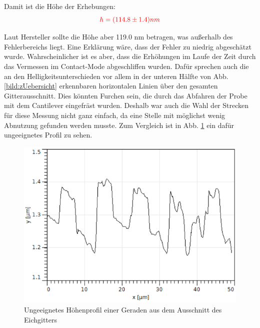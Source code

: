 Damit ist die Höhe der Erhebungen: 
\begin{equation*}
    \textcolor{red}{h = (114.8 \pm 1.4)nm}
\end{equation*}

Laut Hersteller sollte die Höhe aber 119.0 nm betragen, was außerhalb des Fehlerbereichs liegt. Eine Erklärung wäre, dass der Fehler 
zu niedrig abgeschätzt wurde. Wahrscheinlicher ist es aber, dass die Erhöhungen im Laufe der Zeit durch das Vermessen im Contact-Mode 
abgeschliffen wurden. Dafür sprechen auch die an den Helligkeitsunterschieden vor allem in der unteren Hälfte von 
Abb. \ref{bild:zUebersicht} erkennbaren horizontalen Linien über den gesamten Gitterausschnitt. Dies könnten Furchen sein, die durch das 
Abfahren der Probe mit dem Cantilever eingefräst wurden. Deshalb war auch die Wahl der Strecken für diese Messung nicht ganz einfach, da 
eine Stelle mit möglichst wenig Abnutzung gefunden werden musste. Zum Vergleich ist in Abb. \ref{bild:zUngeeignet} ein dafür 
ungeeignetes Profil zu sehen.

\begin{figure}[h]
    \centering
    \includegraphics[scale = 0.5]{Bilder/zUngeeignet.png}
    \caption{Ungeeignetes Höhenprofil einer Geraden aus dem Ausschnitt des Eichgitters}
    \label{bild:zUngeeignet}
\end{figure}

\newpage